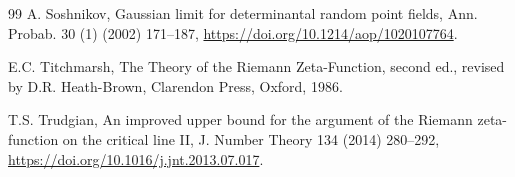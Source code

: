 \documentclass[preprint,12pt]{elsarticle}
\numberwithin{equation}{section}
\theoremstyle{plain}
\theoremstyle{definition}
\theoremstyle{remark}
\begin{document}
\begin{thebibliography}{99}
A. Soshnikov, Gaussian limit for determinantal random point fields, Ann. Probab. 30 (1) (2002) 171--187, \href{https://doi.org/10.1214/aop/1020107764}{https://doi.org/10.1214/aop/1020107764}.

E.C. Titchmarsh, The Theory of the Riemann Zeta-Function, second ed., revised by D.R. Heath-Brown, Clarendon Press, Oxford, 1986.

T.S. Trudgian, An improved upper bound for the argument of the Riemann zeta-function on the critical line II, J. Number Theory 134 (2014) 280--292, \href{https://doi.org/10.1016/j.jnt.2013.07.017}{https://doi.org/10.1016/j.jnt.2013.07.017}.

\end{thebibliography}
\end{document}

